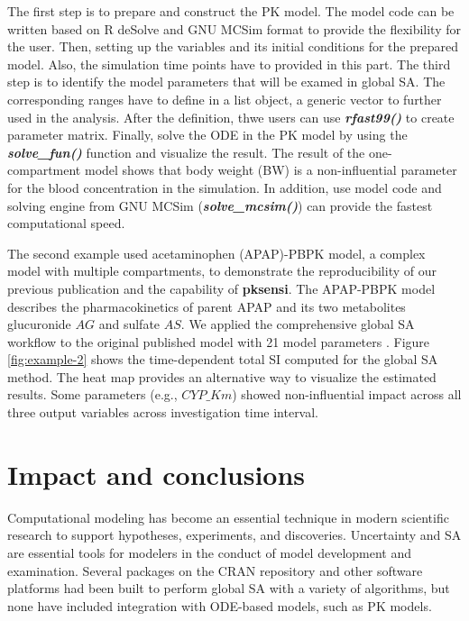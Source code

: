 \documentclass[preprint,12pt, a4paper]{elsarticle}
\begin{document}
The first step is to prepare and construct the PK model. 
The model code can be written based on R deSolve and GNU MCSim format to provide the flexibility for the user. 
Then, setting up the variables and its initial conditions for the prepared model.
Also, the simulation time points have to provided in this part.
The third step is to identify the model parameters that will be examed in global SA.
The corresponding ranges have to define in a list object, a generic vector to further used in the analysis. 
After the definition, thwe users can use \textit{\textbf{rfast99()}} to create parameter matrix. 
Finally, solve the ODE in the PK model by using the \textit{\textbf{solve\_fun()}} function and visualize the result.
The result of the one-compartment model shows that body weight (BW) is a non-influential parameter for the blood concentration in the simulation. In addition, use model code and solving engine from GNU MCSim (\textit{\textbf{solve\_mcsim()}}) can provide the fastest computational speed.

The second example used acetaminophen (APAP)-PBPK model, 
a complex model with multiple compartments, to demonstrate the reproducibility of our previous publication \cite{fphar201800588} and the capability of \textbf{pksensi}. 
The APAP-PBPK model describes the pharmacokinetics of parent APAP and its two metabolites glucuronide \(AG\) and sulfate \(AS\). 
We applied the comprehensive global SA workflow to the original published model with 21 model parameters \cite{s13318-015-0253-x}. 
Figure \ref{fig:example-2} shows the time-dependent total SI computed for the global SA method. The heat map provides an alternative way to visualize the estimated results. Some parameters (e.g., \(CYP\_Km\)) showed non-influential impact across all three output variables across investigation time interval.

\section{Impact and conclusions}

Computational modeling has become an essential technique in modern 
scientific research to support hypotheses, experiments, and discoveries. 
Uncertainty and SA are essential tools for modelers in the conduct of model 
development and examination. 
Several packages on the CRAN repository and other software platforms had been
built to perform global SA with a variety of algorithms, but none have included 
integration with ODE-based models, such as PK models. 
\end{document}
